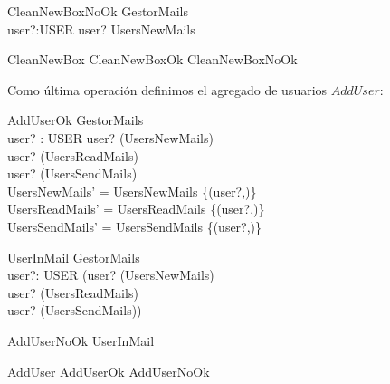 \begin{schema}{CleanNewBoxNoOk}
\Xi GestorMails \\
user?:USER
\where
user? \notin \dom UsersNewMails \\
\end{schema}

\begin{zed}
CleanNewBox  CleanNewBoxOk \lor CleanNewBoxNoOk \\
\end{zed}

Como última operación definimos el agregado de usuarios $AddUser$:

\begin{schema}{AddUserOk}
\Delta GestorMails \\
user? : USER
\where
user? \notin \dom(UsersNewMails) \\
user? \notin \dom(UsersReadMails) \\
user? \notin \dom(UsersSendMails) \\

UsersNewMails' = UsersNewMails \cup \{(user?,\emptyset)\} \\
UsersReadMails' = UsersReadMails \cup \{(user?,\emptyset)\} \\
UsersSendMails' = UsersSendMails \cup \{(user?,\emptyset)\} 
\end{schema}

\begin{schema}{UserInMail}
\Xi GestorMails \\
user?: USER
\where
(user? \in \dom(UsersNewMails)\\
\lor
user? \in \dom(UsersReadMails) \\
\lor
user? \in \dom(UsersSendMails))  
\end{schema}

\begin{zed}
AddUserNoOk  UserInMail \\
\end{zed}
\begin{zed}
AddUser  AddUserOk \lor AddUserNoOk \\
\end{zed}



